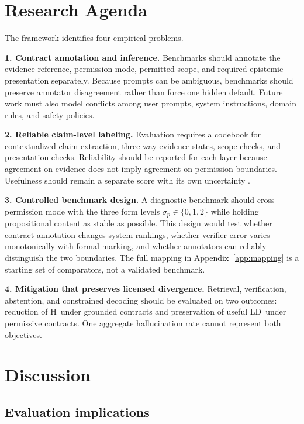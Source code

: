 \documentclass{clv2025}
\newcommand{\LD}{\textsc{LD}}
\newcommand{\Hall}{\textsc{H}}
\begin{document}
\section{Research Agenda}\label{sec:agenda}

The framework identifies four empirical problems.

\textbf{1. Contract annotation and inference.}
Benchmarks should annotate the evidence reference, permission mode, permitted scope, and required epistemic presentation separately.
Because prompts can be ambiguous, benchmarks should preserve annotator disagreement rather than force one hidden default.
Future work must also model conflicts among user prompts, system instructions, domain rules, and safety policies.

\textbf{2. Reliable claim-level labeling.}
Evaluation requires a codebook for contextualized claim extraction, three-way evidence states, scope checks, and presentation checks.
Reliability should be reported for each layer because agreement on evidence does not imply agreement on permission boundaries.
Usefulness should remain a separate score with its own uncertainty \citep{acar_creativity_2019,marco_reader_2025}.

\textbf{3. Controlled benchmark design.}
A diagnostic benchmark should cross permission mode with the three form levels $\sigma_p\in\{0,1,2\}$ while holding propositional content as stable as possible.
This design would test whether contract annotation changes system rankings, whether verifier error varies monotonically with formal marking, and whether annotators can reliably distinguish the two boundaries.
The full mapping in Appendix~\ref{app:mapping} is a starting set of comparators, not a validated benchmark.

\textbf{4. Mitigation that preserves licensed divergence.}
Retrieval, verification, abstention, and constrained decoding should be evaluated on two outcomes: reduction of \Hall\ under grounded contracts and preservation of useful \LD\ under permissive contracts.
One aggregate hallucination rate cannot represent both objectives.

\section{Discussion}\label{sec:discussion}

\subsection{Evaluation implications}
\end{document}
